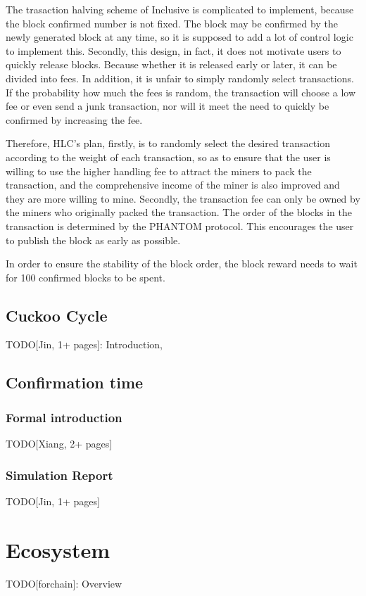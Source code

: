 \documentclass[a4paper,11pt]{article}
\begin{document}
The trasaction halving scheme of Inclusive is complicated to implement, because the block confirmed number is not fixed. The block may be confirmed by the newly generated block at any time, so it is supposed to add a lot of control logic to implement this. Secondly, this design, in fact, it does not motivate users to quickly release blocks. Because whether it is released early or later, it can be divided into fees. In addition, it is unfair to simply randomly select transactions. If the probability how much the fees is random, the transaction will choose a low fee or even send a junk transaction, nor will it meet the need to quickly be confirmed by increasing the fee.

Therefore, HLC's plan, firstly, is to randomly select the desired transaction according to the weight of each transaction, so as to ensure that the user is willing to use the higher handling fee to attract the miners to pack the transaction, and the comprehensive income of the miner is also improved and they are more willing to mine. Secondly, the transaction fee can only be owned by the miners who originally packed the transaction. The order of the blocks in the transaction is determined by the PHANTOM protocol. This encourages the user to publish the block as early as possible.

In order to ensure the stability of the block order, the block reward needs to wait for 100 confirmed blocks to be spent.

\subsection{Cuckoo Cycle}
TODO[Jin, 1+ pages]: Introduction, 

\subsection{Confirmation time}
\subsubsection{Formal introduction}
TODO[Xiang, 2+ pages]
\subsubsection{Simulation Report}
TODO[Jin, 1+ pages]

\section{Ecosystem}
TODO[forchain]: Overview
\end{document}
